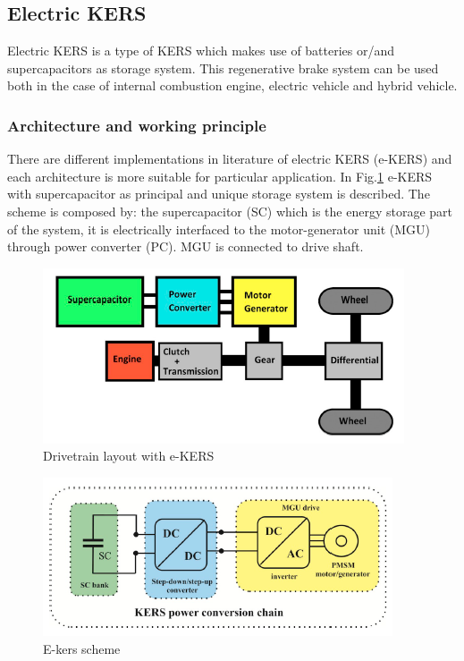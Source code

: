 \documentclass[11pt]{article}
\begin{document}
\subsection{Electric KERS}

Electric KERS is a type of KERS which makes use of batteries or/and supercapacitors as storage system. This regenerative brake system can be used both in the case of internal combustion engine, electric vehicle and hybrid vehicle.

\subsubsection{Architecture and working principle}

There are different implementations in literature of electric KERS (e-KERS) and each architecture is more suitable for particular application. In Fig.\ref{ekersdrivetrainuc} e-KERS with supercapacitor as principal and unique storage system is described. The scheme is composed by: the supercapacitor (SC) which is the energy storage part of the system, it is electrically interfaced to the motor-generator unit (MGU) through power converter (PC). MGU is connected to drive shaft. 

\begin{figure}[H]
	\centering
	\includegraphics[width=.6\textwidth]{Images/Electric_KERS_uconly.PNG}
	\caption{Drivetrain layout with e-KERS}
	\label{ekersdrivetrainuc}
\end{figure}
 
\begin{figure}[H]
	\centering
	\includegraphics[width=.6\textwidth]{Images/Electric_KERS_scheme_uconly.PNG}
	\caption{E-kers scheme}
	\label{ekersschemeuc}
\end{figure}
\end{document}
